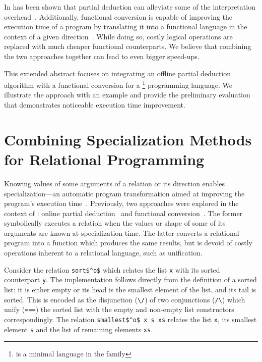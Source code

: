 \documentclass[submission,copyright,creativecommons]{eptcs}
\begin{document}
In has been shown that partial deduction can alleviate some of the interpretation overhead~\cite{de1999conjunctive, EPTCS341.5}.
Additionally, functional conversion is capable of improving the execution time of a program by translating it into a functional language in the context of a given direction~\cite{verbitskaia2024conversion}. 
While doing so, costly logical operations are replaced with much cheaper functional counterparts. 
We believe that combining the two approaches together can lead to even bigger speed-ups. 

This extended abstract focuses on integrating an offline partial deduction algorithm with a functional conversion for a \mk\footnote{\mk is a minimal language in the \kanren family} programming language. 
We illustrate the approach with an example and provide the preliminary evaluation that demonstrates noticeable execution time improvement.

\section{Combining Specialization Methods for Relational Programming}

Knowing values of some arguments of a relation or its direction enables specialization---an automatic program transformation aimed at improving the program's execution time~\cite{gallagher1993tutorial}. 
Previously, two approaches were explored in the context of \mk: online partial deduction~\cite{EPTCS341.5} and functional conversion~\cite{verbitskaia2024conversion}. 
The former symbolically executes a relation when the values or shape of some of its arguments are known at specialization-time. 
The latter converts a relational program into a function which produces the same results, but is devoid of costly operations inherent to a relational language, such as unification. 

Consider the relation \lstinline{sort$^o$} which relates the list \lstinline{x} with its sorted counterpart \lstinline{y}. 
The implementation follows directly from the definition of a sorted list: it is either empty or its head is the smallest element of the list, and its tail is sorted. 
This is encoded as the disjunction (\lstinline{\/}) of two conjunctions (\lstinline{/\}) which unify (\lstinline{===}) the sorted list with the empty and non-empty list constructors correspondingly. 
The relation \lstinline{smallest$^o$ x s xs} relates the list \lstinline{x}, its smallest element \lstinline{s} and the list of remaining elements \lstinline{xs}. 
\end{document}
